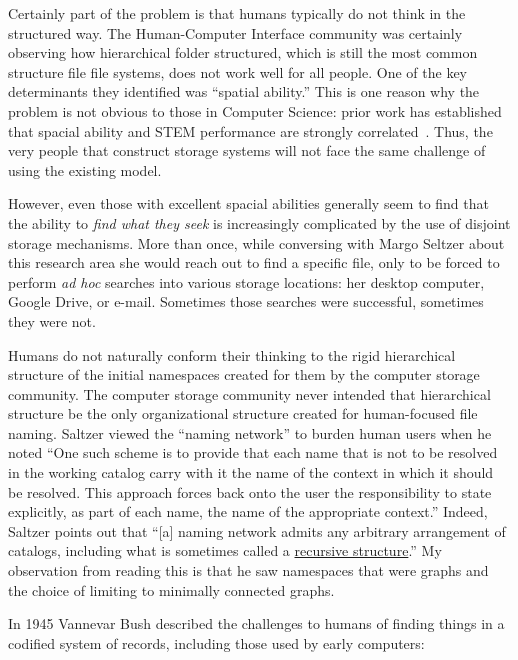 Certainly part of the problem is that humans typically do not think in the
structured way.  The Human-Computer Interface community was certainly observing
how hierarchical folder structured, which is still the most common structure
file file systems, does not work well for all people.  One of the key
determinants they identified was ``spatial ability.''  This is one reason why
the problem is not obvious to those in Computer Science: prior work has
established that spacial ability and STEM performance are strongly
correlated~\cite{doi:10.1177/0016986217722614}.  Thus, the very people that
construct storage systems will not face the same challenge of using the existing
model.

However, even those with excellent spacial abilities generally seem to find that
the ability to \emph{find what they seek} is increasingly complicated by the use
of disjoint storage mechanisms.  More than once, while conversing with Margo
Seltzer about this research area she would reach out to find a specific file,
only to be forced to perform \emph{ad hoc} searches into various storage
locations: her desktop computer, Google Drive, or e-mail.  Sometimes those
searches were successful, sometimes they were not.

Humans do not naturally conform their thinking to the rigid hierarchical
structure of the initial namespaces created for them by the computer storage
community.  The computer storage community never intended that hierarchical
structure be the only organizational structure created for human-focused file
naming. Saltzer viewed the ``naming network'' to burden human users when he
noted ``One such scheme is to provide that each name that is not to be resolved
in the working catalog carry with it the name of the context in which it should
be resolved.  This approach forces back onto the user the responsibility to
state explicitly, as part of each name, the name of the appropriate context.''
Indeed, Saltzer points out that ``[a] naming network admits any arbitrary
arrangement of catalogs, including what is sometimes called a
\underline{recursive structure}.'' My observation from reading this is that he
saw namespaces that were graphs and the choice of limiting to minimally
connected graphs.

In 1945 Vannevar Bush described the challenges to humans of finding things in a
codified system of records, including those used by early computers:

